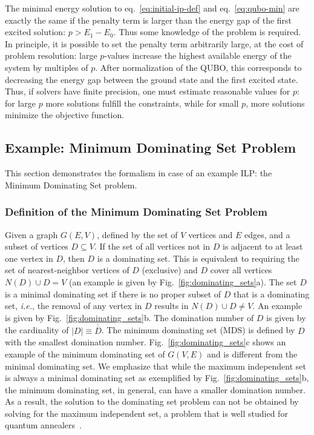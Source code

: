 \documentclass[prd,twocolumn,tightenlines,preprintnumbers,showpacs,superscriptaddress,notitlepage,nofootinbib,eqsecnum,floatfix,longbibliography]{revtex4}
\begin{document}
The minimal energy solution to eq.~\eqref{eq:initial-ip-def} and eq.~\eqref{eq:qubo-min} are exactly the same if the penalty term is larger than the energy gap of the first excited solution: $p > E_1 - E_0$.
Thus some knowledge of the problem is required.
In principle, it is possible to set the penalty term arbitrarily large, at the cost of problem resolution: large $p$-values increase the highest available energy of the system by multiples of $p$.
After normalization of the QUBO, this corresponds to decreasing the energy gap between the ground state and the first excited state.
Thus, if solvers have finite precision, one must estimate reasonable values for $p$: for large $p$ more solutions fulfill the constraints, while for small $p$, more solutions minimize the objective function.


\subsection{Example: Minimum Dominating Set Problem}
\label{sec:methods:mds}

This section demonstrates the formalism in case of an example ILP: the Minimum Dominating Set problem.

\subsubsection{Definition of the Minimum Dominating Set Problem}
\label{sec:methods:mds-def}

Given a graph $G(E,V)$, defined by the set of $V$ vertices and $E$ edges, and a subset of vertices $D \subseteq V$.
If the set of all vertices not in $D$ is adjacent to at least one vertex in $D$, then $D$ is a dominating set.
This is equivalent to requiring the set of nearest-neighbor vertices of $D$ (exclusive) and $D$ cover all vertices $N(D) \cup D = V$ (an example is given by Fig.~\ref{fig:dominating_sets}a).
The set $D$ is a minimal dominating set if there is no proper subset of $D$ that is a dominating set, {\it{i.e.}}, the removal of any vertex in $D$ results in $N(D) \cup D  \neq V$.
An example is given by Fig.~\ref{fig:dominating_sets}b.
The domination number of $D$ is given by the cardinality of $|D| \equiv \overline{\overline{D}}$.
The minimum dominating set (MDS) is defined by $D$ with the smallest domination number.
Fig.~\ref{fig:dominating_sets}c shows an example of the minimum dominating set of $G(V, E)$ and is different from the minimal dominating set.
We emphasize that while the maximum independent set is always a minimal dominating set as exemplified by Fig.~\ref{fig:dominating_sets}b, the minimum dominating set, in general, can have a smaller domination number.
As a result, the solution to the dominating set problem can not be obtained by solving for the maximum independent set, a problem that is well studied for quantum annealers~\cite{}.
\end{document}
